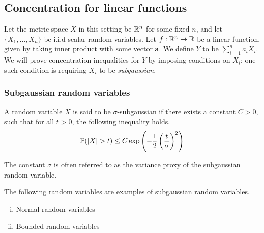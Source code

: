 \documentclass[11pt]{article}
\begin{document}
\subsection{Concentration for linear functions}
\label{sec:conc-line-funct}

Let the metric space $X$ in this setting be $\R^n$ for some fixed $n$, and let $\{X_1, \ldots, X_n \}$ be i.i.d scalar random variables.
Let $f: \R^n \to \R$ be a linear function, given by taking inner product with some vector $\mathbf{a}$.
We define $Y$ to be $\sum_{i=1}^n a_i X_i$.
We will prove concentration inequalities for $Y$ by imposing conditions on $X_i$: one such condition is requiring $X_i$ to be \emph{subgaussian}.

\subsubsection{Subgaussian random variables}
\label{sec:subg-rand-vari}

\begin{definition}
  A random variable $X$ is said to be $\sigma$-subgaussian if there exists a constant $C > 0$, such that for all $t > 0$, the following inequality holds.
  \begin{align*}
    \P(|X| > t) \leq C \exp\left( -\frac{1}{2} \left( \frac{t}{\sigma} \right)^2 \right)
  \end{align*}
\end{definition}
\begin{remark}
  The constant $\sigma$ is often referred to as the variance proxy of the subgaussian random variable.
\end{remark}

\begin{example}
  The following random variables are examples of subgaussian random variables.
  \begin{enumerate}[(i)]
  \item Normal random variables
  \item Bounded random variables
  \end{enumerate}
\end{example}
\end{document}
